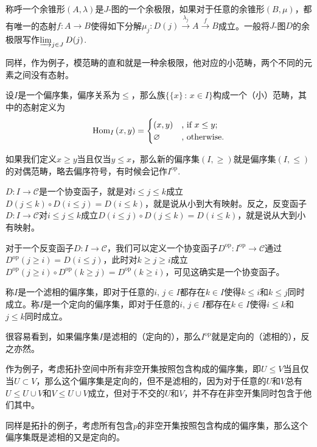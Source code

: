 称呼一个余锥形$(A,\lambda)$是$J$-图的一个{余极限}，如果对于任意的余锥形$(B,\mu)$，都有唯一的态射$f:A\to B$使得如下分解$\mu_j:D(j)\xrightarrow{\lambda_j}A\xrightarrow{f}B$成立。一般将$J$-图$D$的余极限写作$\varinjlim_{j\in J} D(j)$.

同样，作为例子，模范畴的直和就是一种余极限，他对应的小范畴，两个不同的元素之间没有态射。

\para 设$I$是一个偏序集，偏序关系为$\leq$，那么族$\{\{x\}\,:\, x\in I\}$构成一个（小）范畴，其中的态射定义为
\[
	\operatorname{Hom}_{I}\left(x,y\right)=\begin{cases}
	(x,y)&\text{, if }x\leq y\text{;}\\
	\varnothing&\text{, otherwise}.
	\end{cases}
\]

如果我们定义$x\geq y$当且仅当$y\leq x$，那么新的偏序集$(I,\geq)$就是偏序集$(I,\leq)$的对偶范畴，略去偏序符号，有时候会记作$I^{\mathrm{op}}$.

$D:I\to \mathcal{C}$是一个协变函子，就是对$i\leq j\leq k$成立$D(j\leq k)\circ D(i\leq j)=D(i\leq k)$，就是说从小到大有映射。反之，反变函子$D:I\to \mathcal{C}$对$i\leq j\leq k$成立$D(i\leq j)\circ D(j\leq k)=D(i\leq k)$，就是说从大到小有映射。

对于一个反变函子$D:I\to \mathcal{C}$，我们可以定义一个协变函子$D^{\mathrm{op}} :I^{\mathrm{op}}\to \mathcal{C}$通过$D^{\mathrm{op}}(j\geq i)=D(i\leq j)$，此时对$k\geq j\geq i$成立$D^{\mathrm{op}}(j\geq i)\circ D^{\mathrm{op}}(k\geq j)=D^{\mathrm{op}}(k\geq i)$，可见这确实是一个协变函子。

\para 称$I$是一个滤相的偏序集，即对于任意的$i$, $j\in I$都存在$k\in I$使得$k\leq i$和$k\leq j$同时成立。称$I$是一个定向的偏序集，即对于任意的$i$, $j\in I$都存在$k\in I$使得$i\leq k$和$j\leq k$同时成立。

很容易看到，如果偏序集$I$是滤相的（定向的），那么$I^{\mathrm{op}}$就是定向的（滤相的），反之亦然。

作为例子，考虑拓扑空间中所有非空开集按照包含构成的偏序集，即$U\leq V$当且仅当$U\subset V$，那么这个偏序集是定向的，但不是滤相的，因为对于任意的$U$和$V$总有$U\leq U\cup V$和$V\leq U\cup V$成立，但对于不交的$U$和$V$，并不存在非空开集同时包含于他们其中。

同样是拓扑的例子，考虑所有包含$p$的非空开集按照包含构成的偏序集，那么这个偏序集既是滤相的又是定向的。

